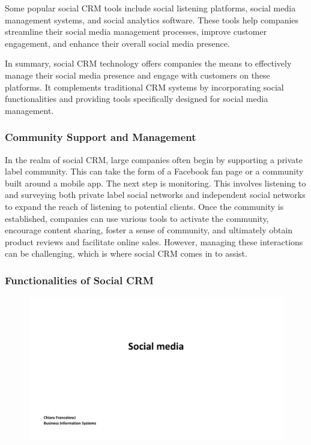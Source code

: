 Some popular social CRM tools include social listening platforms, social
media management systems, and social analytics software. These tools
help companies streamline their social media management processes,
improve customer engagement, and enhance their overall social media
presence.

In summary, social CRM technology offers companies the means to
effectively manage their social media presence and engage with customers
on these platforms. It complements traditional CRM systems by
incorporating social functionalities and providing tools specifically
designed for social media management.

\subsubsection{Community Support and
    Management}\label{community-support-and-management}

In the realm of social CRM, large companies often begin by supporting a
private label community. This can take the form of a Facebook fan page
or a community built around a mobile app. The next step is monitoring.
This involves listening to and surveying both private label social
networks and independent social networks to expand the reach of
listening to potential clients. Once the community is established,
companies can use various tools to activate the community, encourage
content sharing, foster a sense of community, and ultimately obtain
product reviews and facilitate online sales. However, managing these
interactions can be challenging, which is where social CRM comes in to
assist.

\subsubsection{Functionalities of Social
    CRM}\label{functionalities-of-social-crm}

\begin{figure}[!h]
    \centering
    \includegraphics[page=25, trim = 0cm 3.5cm 5cm 0.5cm, clip, width=\textwidth]{images/04 - Social_Media.pdf}
\end{figure}

